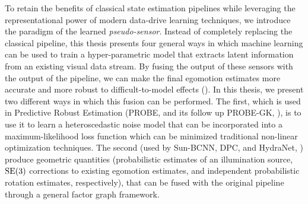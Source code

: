 To retain the benefits of classical state estimation pipelines while leveraging the representational power of modern data-drive learning techniques, we introduce the paradigm of the learned \textit{pseudo-sensor}. Instead of completely replacing the classical pipeline, this thesis presents four general ways in which machine learning can be used to train a hyper-parametric model that extracts latent information from an existing visual data stream. By fusing the output of these sensors with the output of the pipeline, we can make the final egomotion estimates more accurate and more robust to difficult-to-model effects (). In this thesis, we present two different ways in which this fusion can be performed. The first, which is used in Predictive Robust Estimation (PROBE, and its follow up PROBE-GK, ), is to use it to learn a heteroscedastic noise model that can be incorporated into a maximum-likelihood loss function which can be minimized traditional non-linear optimization techniques. The second (used by Sun-BCNN, DPC, and HydraNet,  ) produce geometric quantities (probabilistic estimates of an illumination source, $\mathrm{SE}(3)$ corrections to existing egomotion estimates, and independent probabilistic rotation estimates, respectively), that can be fused with the original pipeline through a general factor graph framework.


